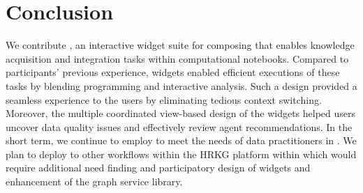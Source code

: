 \section{Conclusion}
\label{sec:conclusion}
We contribute \system, an interactive widget suite
for composing  
that enables knowledge acquisition and integration tasks
within computational notebooks. 
Compared to participants' previous experience,
\system widgets
enabled efficient executions of these tasks
by blending programming and interactive analysis.
Such a design provided a seamless experience to the 
users by eliminating tedious context switching.
Moreover, the multiple coordinated view-based
design of the widgets helped users 
uncover data quality issues
and effectively review agent recommendations. 
In the short term, we continue to employ \system
to meet the needs of data practitioners in \company.
We plan to deploy \system to other workflows within
the HRKG platform within \company which would require
additional need finding and participatory design of widgets
and enhancement of the graph service library.
